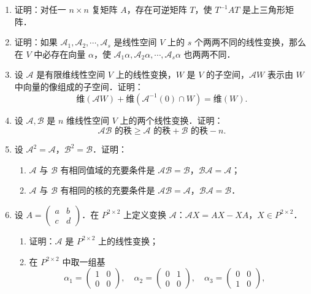 \begin{enumerate}
\begin{enumerate}
  \anssub
  \end{enumerate}
  \item 证明：对任一 $n\times n$ 复矩阵 $A$，存在可逆矩阵 $T$，使 $T^{-1}AT$ 是上三角形矩阵．
  \ansproof
  \item 证明：如果 $\mathcal{A}_1,\mathcal{A}_2,\cdots,\mathcal{A}_s$ 是线性空间 $V$ 上的 $s$ 个两两不同的线性变换，那么在 $V$ 中必存在向量 $\alpha$，使 $\mathcal{A}_1\alpha,\mathcal{A}_2\alpha,\cdots,\mathcal{A}_s\alpha$ 也两两不同．
  \ansproof
  \item 设 $\mathcal{A}$ 是有限维线性空间 $V$ 上的线性变换，$W$ 是 $V$ 的子空间，$\mathcal{A}W$ 表示由 $W$ 中向量的像组成的子空间．证明：
  \[
    \text{维}(\mathcal{A}W)+\text{维}(\mathcal{A}^{-1}(0)\cap W)=\text{维}(W).
  \]
  \ansproof
  \item 设 $\mathcal{A},\mathcal{B}$ 是 $n$ 维线性空间 $V$ 上的两个线性变换．证明：
  \[
    \mathcal{A}\mathcal{B}\text{ 的秩}\ge \mathcal{A}\text{ 的秩}+\mathcal{B}\text{ 的秩}-n.
  \]
  \ansproof
  \item 设 $\mathcal{A}^2=\mathcal{A}$，$\mathcal{B}^2=\mathcal{B}$．证明：
  \begin{enumerate}
    \item $\mathcal{A}$ 与 $\mathcal{B}$ 有相同值域的充要条件是 $\mathcal{A}\mathcal{B}=\mathcal{B}$，$\mathcal{B}\mathcal{A}=\mathcal{A}$；
  \anssub
    \item $\mathcal{A}$ 与 $\mathcal{B}$ 有相同的核的充要条件是 $\mathcal{A}\mathcal{B}=\mathcal{A}$，$\mathcal{B}\mathcal{A}=\mathcal{B}$．
  \anssub
  \end{enumerate}
  \item 设 $A=\begin{pmatrix}a&b\\c&d\end{pmatrix}$．在 $P^{2\times 2}$ 上定义变换 $\mathcal{A}$：$\mathcal{A}X=AX-XA$，$X\in P^{2\times 2}$．
  \begin{enumerate}
    \item 证明：$\mathcal{A}$ 是 $P^{2\times 2}$ 上的线性变换；
  \anssub
    \item 在 $P^{2\times 2}$ 中取一组基
    \[
      \alpha_1=\begin{pmatrix}1&0\\0&0\end{pmatrix},\quad
      \alpha_2=\begin{pmatrix}0&1\\0&0\end{pmatrix},\quad
      \alpha_3=\begin{pmatrix}0&0\\1&0\end{pmatrix},\quad
\]
\end{enumerate}
\end{enumerate}
